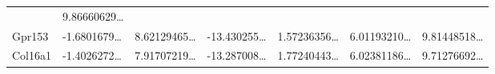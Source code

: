 \documentclass[
]{article}
\begin{document}
\begin{longtable}[]{@{}lllllll@{}}
\begin{minipage}[t]{0.12\columnwidth}
\end{minipage} & \begin{minipage}[t]{0.12\columnwidth}\raggedright
9.86660629\ldots{}\strut
\end{minipage}\tabularnewline
\begin{minipage}[t]{0.08\columnwidth}\raggedright
Gpr153\strut
\end{minipage} & \begin{minipage}[t]{0.12\columnwidth}\raggedright
-1.6801679\ldots{}\strut
\end{minipage} & \begin{minipage}[t]{0.12\columnwidth}\raggedright
8.62129465\ldots{}\strut
\end{minipage} & \begin{minipage}[t]{0.12\columnwidth}\raggedright
-13.430255\ldots{}\strut
\end{minipage} & \begin{minipage}[t]{0.12\columnwidth}\raggedright
1.57236356\ldots{}\strut
\end{minipage} & \begin{minipage}[t]{0.12\columnwidth}\raggedright
6.01193210\ldots{}\strut
\end{minipage} & \begin{minipage}[t]{0.12\columnwidth}\raggedright
9.81448518\ldots{}\strut
\end{minipage}\tabularnewline
\begin{minipage}[t]{0.08\columnwidth}\raggedright
Col16a1\strut
\end{minipage} & \begin{minipage}[t]{0.12\columnwidth}\raggedright
-1.4026272\ldots{}\strut
\end{minipage} & \begin{minipage}[t]{0.12\columnwidth}\raggedright
7.91707219\ldots{}\strut
\end{minipage} & \begin{minipage}[t]{0.12\columnwidth}\raggedright
-13.287008\ldots{}\strut
\end{minipage} & \begin{minipage}[t]{0.12\columnwidth}\raggedright
1.77240443\ldots{}\strut
\end{minipage} & \begin{minipage}[t]{0.12\columnwidth}\raggedright
6.02381186\ldots{}\strut
\end{minipage} & \begin{minipage}[t]{0.12\columnwidth}\raggedright
9.71276692\ldots{}\strut
\end{minipage}\tabularnewline

\end{longtable}
\end{document}
